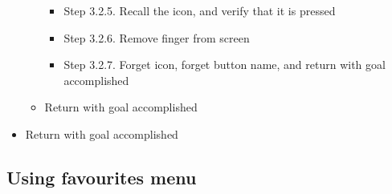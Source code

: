 \documentclass{article}
\begin{document}
\begin{itemize}
\begin{itemize}
\begin{itemize}
					\item Step 3.2.5. Recall the icon, and verify that it is pressed
					\item Step 3.2.6. Remove finger from screen
					\item Step 3.2.7. Forget icon, forget button name, and return with goal accomplished
				\end{itemize}
    			\item Return with goal accomplished
		\end{itemize}
	\item Return with goal accomplished
\end{itemize}

\subsection*{Using favourites menu}
\end{document}
